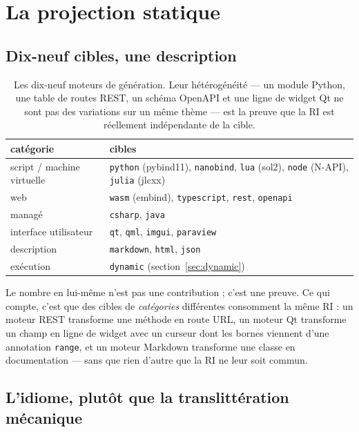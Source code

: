 \documentclass[11pt,a4paper]{article}
\newcommand{\code}[1]{\texttt{\small #1}}
\begin{document}
\section{La projection statique}
\label{sec:static}

\subsection{Dix-neuf cibles, une description}

\begin{table}[h]
\centering\small
\begin{tabular}{ll}
\toprule
catégorie & cibles \\
\midrule
script / machine virtuelle & \code{python} (pybind11), \code{nanobind}, \code{lua} (sol2), \code{node} (N-API), \code{julia} (jlcxx) \\
web & \code{wasm} (embind), \code{typescript}, \code{rest}, \code{openapi} \\
managé & \code{csharp}, \code{java} \\
interface utilisateur & \code{qt}, \code{qml}, \code{imgui}, \code{paraview} \\
description & \code{markdown}, \code{html}, \code{json} \\
exécution & \code{dynamic} (section~\ref{sec:dynamic}) \\
\bottomrule
\end{tabular}
\caption{Les dix-neuf moteurs de génération. Leur hétérogénéité --- un module
Python, une table de routes REST, un schéma OpenAPI et une ligne de widget Qt ne
sont pas des variations sur un même thème --- est la preuve que la RI est
réellement indépendante de la cible.}
\label{tab:backends}
\end{table}

Le nombre en lui-même n'est pas une contribution ; c'est une preuve. Ce qui
compte, c'est que des cibles de \emph{catégories} différentes consomment la même
RI : un moteur REST transforme une méthode en route URL, un moteur Qt transforme
un champ en ligne de widget avec un curseur dont les bornes viennent d'une
annotation \code{range}, et un moteur Markdown transforme une classe en
documentation --- sans que rien d'autre que la RI ne leur soit commun.

\subsection{L'idiome, plutôt que la translittération mécanique}
\label{sec:idiom}
\end{document}
